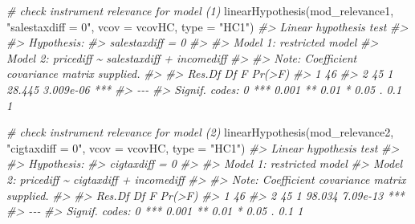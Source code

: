 \documentclass[
  14pt,
]{memoir}
\newenvironment{Shaded}{\begin{snugshade}}{\end{snugshade}}
\newcommand{\AttributeTok}[1]{\textcolor[rgb]{0.77,0.63,0.00}{#1}}
\newcommand{\CommentTok}[1]{\textcolor[rgb]{0.56,0.35,0.01}{\textit{#1}}}
\newcommand{\FunctionTok}[1]{\textcolor[rgb]{0.00,0.00,0.00}{#1}}
\newcommand{\NormalTok}[1]{#1}
\newcommand{\StringTok}[1]{\textcolor[rgb]{0.31,0.60,0.02}{#1}}
\begin{document}
\begin{Shaded}
\begin{Highlighting}[]
\CommentTok{\# check instrument relevance for model (1)}
\FunctionTok{linearHypothesis}\NormalTok{(mod\_relevance1, }
                 \StringTok{"salestaxdiff = 0"}\NormalTok{, }
                 \AttributeTok{vcov =}\NormalTok{ vcovHC, }\AttributeTok{type =} \StringTok{"HC1"}\NormalTok{)}
\CommentTok{\#\textgreater{} Linear hypothesis test}
\CommentTok{\#\textgreater{} }
\CommentTok{\#\textgreater{} Hypothesis:}
\CommentTok{\#\textgreater{} salestaxdiff = 0}
\CommentTok{\#\textgreater{} }
\CommentTok{\#\textgreater{} Model 1: restricted model}
\CommentTok{\#\textgreater{} Model 2: pricediff \textasciitilde{} salestaxdiff + incomediff}
\CommentTok{\#\textgreater{} }
\CommentTok{\#\textgreater{} Note: Coefficient covariance matrix supplied.}
\CommentTok{\#\textgreater{} }
\CommentTok{\#\textgreater{}   Res.Df Df      F    Pr(\textgreater{}F)    }
\CommentTok{\#\textgreater{} 1     46                        }
\CommentTok{\#\textgreater{} 2     45  1 28.445 3.009e{-}06 ***}
\CommentTok{\#\textgreater{} {-}{-}{-}}
\CommentTok{\#\textgreater{} Signif. codes:  0 \textquotesingle{}***\textquotesingle{} 0.001 \textquotesingle{}**\textquotesingle{} 0.01 \textquotesingle{}*\textquotesingle{} 0.05 \textquotesingle{}.\textquotesingle{} 0.1 \textquotesingle{} \textquotesingle{} 1}
\end{Highlighting}
\end{Shaded}

\begin{Shaded}
\begin{Highlighting}[]
\CommentTok{\# check instrument relevance for model (2)}
\FunctionTok{linearHypothesis}\NormalTok{(mod\_relevance2, }
                 \StringTok{"cigtaxdiff = 0"}\NormalTok{, }
                 \AttributeTok{vcov =}\NormalTok{ vcovHC, }\AttributeTok{type =} \StringTok{"HC1"}\NormalTok{)}
\CommentTok{\#\textgreater{} Linear hypothesis test}
\CommentTok{\#\textgreater{} }
\CommentTok{\#\textgreater{} Hypothesis:}
\CommentTok{\#\textgreater{} cigtaxdiff = 0}
\CommentTok{\#\textgreater{} }
\CommentTok{\#\textgreater{} Model 1: restricted model}
\CommentTok{\#\textgreater{} Model 2: pricediff \textasciitilde{} cigtaxdiff + incomediff}
\CommentTok{\#\textgreater{} }
\CommentTok{\#\textgreater{} Note: Coefficient covariance matrix supplied.}
\CommentTok{\#\textgreater{} }
\CommentTok{\#\textgreater{}   Res.Df Df      F   Pr(\textgreater{}F)    }
\CommentTok{\#\textgreater{} 1     46                       }
\CommentTok{\#\textgreater{} 2     45  1 98.034 7.09e{-}13 ***}
\CommentTok{\#\textgreater{} {-}{-}{-}}
\CommentTok{\#\textgreater{} Signif. codes:  0 \textquotesingle{}***\textquotesingle{} 0.001 \textquotesingle{}**\textquotesingle{} 0.01 \textquotesingle{}*\textquotesingle{} 0.05 \textquotesingle{}.\textquotesingle{} 0.1 \textquotesingle{} \textquotesingle{} 1}
\end{Highlighting}
\end{Shaded}
\end{document}
